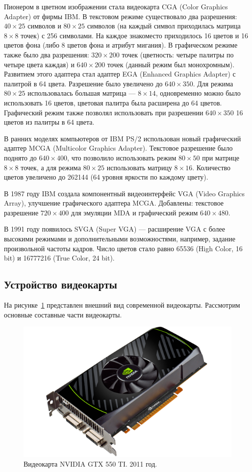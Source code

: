 Пионером в цветном изображении стала видеокарта CGA (Co\-lor Gra\-phics Adap\-ter) от фирмы IBM. В текстовом режиме существовало два разрешения: $40 \times 25$ символов и $80 \times 25$ символов (на каждый символ приходилась матрица $8 \times 8$ точек) с 256 символами. На каждое знакоместо приходилось 16 цветов и 16 цветов фона (либо 8 цветов фона и атрибут мигания). В графическом режиме также было два разрешения: $320 \times 200$ точек (цветность: четыре палитры по четыре цвета каждая) и $640 \times 200$ точек (данный режим был монохромным). Развитием этого адаптера стал адаптер EGA (En\-han\-ced Gra\-phics Adap\-ter) с палитрой в 64 цвета. Разрешение было увеличено до $640 \times 350$. Для режима $80 \times 25$ использовалась большая матрица --- $8 \times 14$, одновременно можно было использовать 16 цветов, цветовая палитра была расширена до 64 цветов. Графический режим также позволял использовать при разрешении $640 \times 350$ 16 цветов из палитры в 64 цвета.

В ранних моделях компьютеров от IBM PS/2 использован новый графический адаптер MCGA (Multicolor Graphics Adapter). Текстовое разрешение было поднято до $640 \times 400$, что позволило использовать режим $80 \times 50$ при матрице $8 \times 8$ точек, а для режима $80 \times 25$ использовать матрицу $8 \times 16$. Количество цветов увеличено до 262144 (64 уровня яркости по каждому цвету).


В 1987 году IBM создала компонентный видеоинтерфейс VGA (Video Graphics Array), улучшение графического адаптера MCGA. Добавлены: текстовое разрешение $720 \times 400$ для эмуляции MDA и графический режим $640 \times 480$.

В 1991 году появилось SVGA (Super VGA) --- расширение VGA с более высокими режимами и дополнительными возможностями, например, задание произвольной частоты кадров. Число цветов стало равно 65536 (High Color, 16 bit) и 16777216 (True Color, 24 bit).


\subsection{Устройство видеокарты}

На рисунке~\ref{ris:moderncard} представлен внешний вид современной видеокарты. Рассмотрим основные составные части видеокарты.

\begin{figure}[ht!]
\begin{center}
\includegraphics[width=0.5\linewidth]{img/gtx_550_ti.png}
\caption{Видеокарта NVIDIA GTX 550 TI. 2011 год.}
\label{ris:moderncard}
\end{center}
\end{figure}

